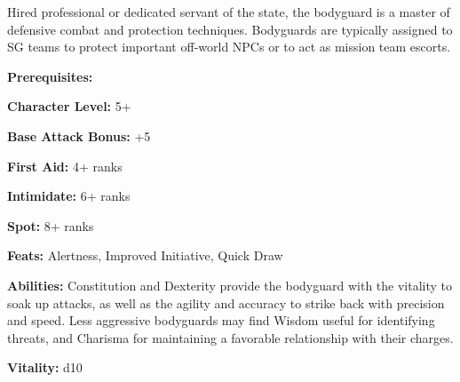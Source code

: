 \begin{multicols}{2}

Hired professional or dedicated servant of the state, the bodyguard is a master of defensive combat and protection techniques. Bodyguards are typically assigned to SG teams to protect important off-world NPCs or to act as mission team escorts.

\columnbreak

\textbf{Prerequisites:} 
\begin{description*}
\item[\hspace{1.5cm}\textbf{Character Level:}] 5+
\item[\hspace{1.5cm}\textbf{Base Attack Bonus:}] +5
\item[\hspace{1.5cm}\textbf{First Aid:}] 4+ ranks
\item[\hspace{1.5cm}\textbf{Intimidate:}] 6+ ranks
\item[\hspace{1.5cm}\textbf{Spot:}] 8+ ranks
\item[\hspace{1.5cm}\textbf{Feats:}] Alertness, Improved Initiative, Quick Draw
\end{description*}

\textbf{Abilities:} Constitution and Dexterity provide the bodyguard with the vitality to soak up attacks, as well as the agility and accuracy to strike back with precision and speed. Less aggressive bodyguards may find Wisdom useful for identifying threats, and Charisma for maintaining a favorable relationship with their charges.

\textbf{Vitality:} d10

\end{multicols}

\setlength{\intextsep}{-6cm}

